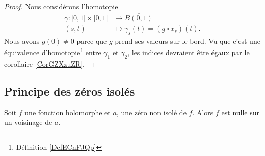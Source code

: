 \begin{proof}
    Nous considérons l'homotopie 
    \begin{equation}
        \begin{aligned}
            \gamma\colon \mathopen[ 0 , 1 \mathclose]\times \mathopen[ 0 , 1 \mathclose]&\to \overline{ B(0,1) } \\
            (s,t)&\mapsto \gamma_s(t)=(g\circ x_s)(t). 
        \end{aligned}
    \end{equation}
    Nous avons \( g(0)\neq 0\) parce que \( g\) prend ses valeurs sur le bord. Vu que c'est une équivalence d'homotopie\footnote{Définition \ref{DefECnFJQp}} entre \( \gamma_1\) et \( \gamma_2\), les indices devraient être égaux par le corollaire \ref{CorGZXzuZR}.
\end{proof}

\subsection{Principe des zéros isolés}

\begin{theorem}     \label{ThoukDPBX}
    Soit \( f\) une fonction holomorphe et \( a\), une zéro non isolé de \( f\). Alors \( f\) est nulle sur un voisinage de \( a\).
\end{theorem}

